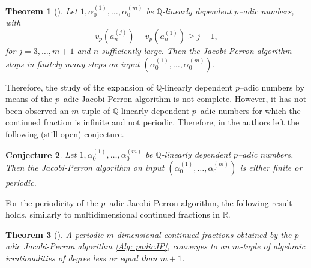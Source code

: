 \documentclass[12pt, reqno]{amsart}
\theoremstyle{plain}
\newtheorem{Theorem}{Theorem}
\newtheorem{Conjecture}[Theorem]{Conjecture}
\theoremstyle{definition}
\begin{document}
\begin{Theorem}[\cite{MT2}]
Let $1,\alpha_0^{(1)},\ldots,\alpha_0^{(m)}$ be $\mathbb{Q}$-linearly dependent $p$--adic numbers, with
\[v_p(a_n^{(j)})-v_p(a_n^{(1)})\geq j-1,\]
for $j=3,\ldots,m+1$ and $n$ sufficiently large. Then the Jacobi-Perron algorithm stops in finitely many steps on input $(\alpha_0^{(1)},\ldots,\alpha_0^{(m)})$.
\end{Theorem}

Therefore, the study of the expansion of $\mathbb{Q}$-linearly dependent $p$--adic numbers by means of the $p$--adic Jacobi-Perron algorithm is not complete. However, it has not been observed an $m$-tuple of $\mathbb{Q}$-linearly dependent $p$--adic numbers for which the continued fraction is infinite and not periodic. Therefore, in \cite{MT1} the authors left the following (still open) conjecture.

\begin{Conjecture}
Let $1,\alpha_0^{(1)},\ldots,\alpha_0^{(m)}$ be $\mathbb{Q}$-linearly dependent $p$--adic numbers. Then the Jacobi-Perron algorithm on input $(\alpha_0^{(1)},\ldots,\alpha_0^{(m)})$ is either finite or periodic.
\end{Conjecture}

For the periodicity of the $p$--adic Jacobi-Perron algorithm, the following result holds, similarly to multidimensional continued fractions in $\mathbb{R}$.

\begin{Theorem}[\cite{MT2}]
A periodic $m$-dimensional continued fractions obtained by the $p$--adic Jacobi-Perron algorithm \eqref{Alg: padicJP}, converges to an $m$-tuple of algebraic irrationalities of degree less or equal than $m+1$.
\end{Theorem}
\end{document}
